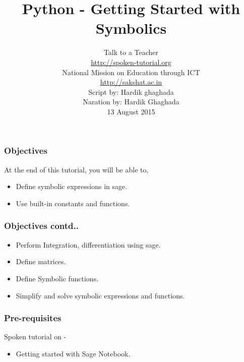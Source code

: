 \documentclass[17pt,compress]{beamer}
\author[FOSSEE]{}
\institute[IIT Bombay]{}
\date[]{}
\begin{document}
\sffamily \bfseries
\title
[Getting Started with Symbolics]
{Python - Getting Started with Symbolics}
\author
[FOSSEE, IIT - Bombay]
{\small Talk to a Teacher\\{\color{blue}\url{http://spoken-tutorial.org}}\\National Mission on Education
 through ICT\\{\color{blue}\url{http://sakshat.ac.in}} \\[0.5cm]{\tiny Script by: Hardik ghaghada \\ Naration by: Hardik Ghaghada \\ 13 August 2015}}

\begin{frame}
   \titlepage
\end{frame}
\begin{frame}
\frametitle{Objectives}
\label{sec-2.1}

 At the end of this tutorial, you will be able to,\pause


\begin{itemize}
\item Define symbolic expressions in sage.\pause
\item Use built-in constants and functions.
\end{itemize}
\end{frame}
\begin{frame}
\frametitle{Objectives contd..}
\label{sec-2.2}

\begin{itemize}
\item Perform Integration, differentiation using sage.
\item Define matrices.\pause
\item Define Symbolic functions.\pause
\item Simplify and solve symbolic expressions and functions.
\end{itemize}
\end{frame}
\begin{frame}
\frametitle{Pre-requisites}
\label{sec-3}

  Spoken tutorial on -

\begin{itemize}
\item Getting started with Sage Notebook.
\end{itemize}
\end{frame}
\end{document}
